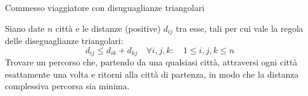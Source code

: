 \begin{frame}{Commesso viaggiatore con disuguaglianze triangolari}

\vspace{-9pt}
\begin{myboxtitle}
Siano date $n$ città e le distanze (positive) $d_{ij}$ tra esse, \alert{tali per cui vale
la regola delle diseguaglianze triangolari:
\smallskip
\[
d_{ij} \le d_{ik} + d_{kj} \quad \forall i,j,k : \quad 1 \le i, j, k \le n
\]}
Trovare un percorso
che, partendo da una qualsiasi città, attraversi ogni città esattamente una
volta e ritorni alla città di partenza, in modo che la distanza complessiva
percorsa sia minima.
\end{myboxtitle}



\end{frame}


